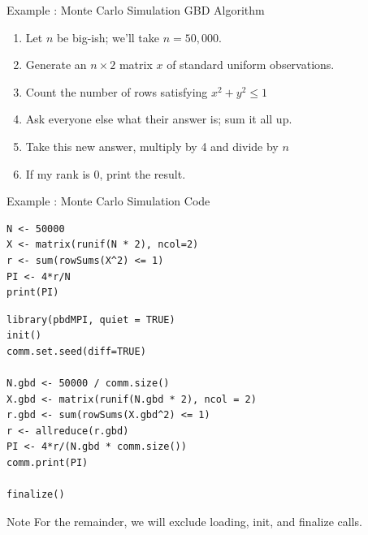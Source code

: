 \begin{frame}[fragile]
  \begin{block}{Example \showex :  Monte Carlo Simulation GBD Algorithm}\pause
    \begin{enumerate}
     \item Let $n$ be big-ish; we'll take $n=50,000$.
     \item Generate an $n\times 2$ matrix $x$ of standard uniform observations.
     \item Count the number of rows satisfying $x^2 + y^2 \leq 1$
     \item Ask everyone else what their answer is; sum it all up.
     \item Take this new answer, multiply by 4 and divide by $n$
     \item If my rank is 0, print the result.
    \end{enumerate}
  \end{block}
\end{frame}


\begin{frame}
  \begin{exampleblock}{Example \showex :  Monte Carlo Simulation Code}\pause
\begin{lstlisting}[title=Serial Code]
N <- 50000
X <- matrix(runif(N * 2), ncol=2)
r <- sum(rowSums(X^2) <= 1)
PI <- 4*r/N
print(PI)
\end{lstlisting}

\begin{lstlisting}[title=Parallel Code]
library(pbdMPI, quiet = TRUE)
init()
comm.set.seed(diff=TRUE)

N.gbd <- 50000 / comm.size()
X.gbd <- matrix(runif(N.gbd * 2), ncol = 2)
r.gbd <- sum(rowSums(X.gbd^2) <= 1)
r <- allreduce(r.gbd)
PI <- 4*r/(N.gbd * comm.size())
comm.print(PI)

finalize()
\end{lstlisting}
  \end{exampleblock}
\end{frame}

\begin{frame}[fragile]
  \begin{block}{Note}\pause
    For the remainder, we will exclude loading, init, and finalize calls.
  \end{block}
\end{frame}










